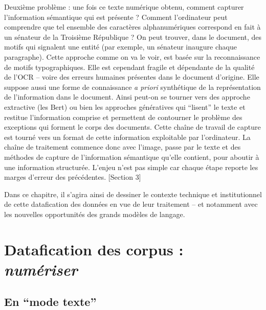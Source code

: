 Deuxième problème : une fois ce texte numérique obtenu, comment capturer l'information sémantique qui est présente ? Comment l'ordinateur peut comprendre que tel ensemble des caractères alphanumériques correspond en fait à un sénateur de la Troisième République ? On peut trouver, dans le document, des motifs qui signalent une entité (par exemple, un sénateur inaugure chaque paragraphe). Cette approche comme on va le voir, est basée sur la reconnaissance de motifs typographiques. Elle est cependant fragile et dépendante de la qualité de l'OCR -- voire des erreurs humaines présentes dans le document d'origine. Elle suppose aussi une forme de connaissance \emph{a priori} synthétique de la représentation de l'information dans le document. Ainsi peut-on se tourner vers des approche extractive (les Bert) ou bien les approches génératives qui \enquote{lisent} le texte et restitue l'information comprise et permettent de contourner le problème des exceptions qui forment le corps des documents. Cette chaîne de travail de capture est tourné vers un format de cette information exploitable par l'ordinateur. La chaîne de traitement commence donc avec l'image, passe par le texte et des méthodes de capture de l'information sémantique qu'elle contient, pour aboutir à une information structurée. L'enjeu n'est pas simple car chaque étape reporte les marges d'erreur des précédentes. [Section 3]

Dans ce chapitre, il s'agira ainsi de dessiner le contexte technique et institutionnel de cette datafication des données en vue de leur traitement -- et notamment avec les nouvelles opportunités des grands modèles de langage.

\section{Datafication des corpus : \emph{numériser}}

\subsection{En \enquote{mode texte}}

